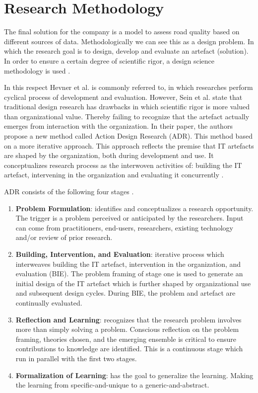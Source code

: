 \clearpage
\section{Research Methodology}

The final solution for the company is a model to assess road quality based on different sources of data. Methodologically we can see this as a design problem. In which the research goal is to design, develop and evaluate an artefact (solution)\cite{Hevner2004}. In order to ensure a certain degree of scientific rigor, a design science methodology is used \cite{Versloot2019}.

In this respect Hevner et al. \cite{Hevner2004} is commonly referred to, in which researches perform cyclical process of development and evaluation. However, Sein et al. \cite{Sein2011} state that traditional design research has drawbacks in which scientific rigor is more valued than organizational value. Thereby failing to recognize that the artefact actually emerges from interaction with the organization. In their paper, the authors propose a new method called Action Design Research (ADR). This method based on a more iterative approach. This approach reflects the premise that IT artefacts are shaped by the organization, both during development and use. It conceptualizes research process as the interwoven activities of: building the IT artefact, intervening in the organization and evaluating it concurrently \cite{Sein2011}.

ADR consists of the following four stages \cite{Sein2011}.
\begin{enumerate}
\item \textbf{Problem Formulation}: identifies and conceptualizes a research opportunity. The trigger is a problem perceived or anticipated by the researchers. Input can come from practitioners, end-users, researchers, existing technology and/or review of prior research.
\item \textbf{Building, Intervention, and Evaluation}: iterative process which interweaves building the IT artefact, intervention in the organization, and evaluation (BIE). The problem framing of stage one is used to generate an initial design of the IT artefact which is further shaped by organizational use and subsequent design cycles. During BIE, the problem and artefact are continually evaluated.
\item \textbf{Reflection and Learning}: recognizes that the research problem involves more than simply solving a problem. Conscious reflection on the problem framing, theories chosen, and the emerging ensemble is critical to ensure contributions to knowledge are identified. This is a continuous stage which run in parallel with the first two stages.
\item \textbf{Formalization of Learning}: has the goal to generalize the learning. Making the learning from specific-and-unique to a generic-and-abstract. 
\end{enumerate}

